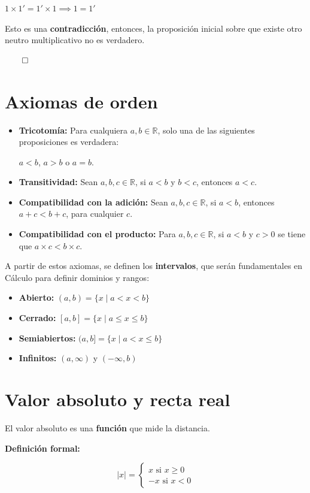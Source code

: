 \documentclass{article}
\begin{document}
$1 \times 1' = 1' \times 1 \implies 1 = 1'$

Esto es una \textbf{contradicción}, entonces, la proposición inicial sobre que existe otro neutro multiplicativo no es verdadero.

$\qed$

\section{Axiomas de orden}

\begin{itemize}
    \item \textbf{Tricotomía:} Para cualquiera $a, b \in \mathbb{R}$, solo una de las siguientes proposiciones es verdadera: 
    
    $a < b$, $a > b$ o $a = b$.
    \item \textbf{Transitividad:} Sean $a, b, c \in \mathbb{R}$, si $a < b$ y $b < c$, entonces $a < c$.
    \item \textbf{Compatibilidad con la adición:} Sean $a, b, c \in \mathbb{R}$, si $a < b$, entonces $a + c < b + c$, para cualquier $c$.
    \item \textbf{Compatibilidad con el producto:} Para $a, b, c \in \mathbb{R}$, si $a < b$ y $c > 0$ se tiene que $a \times c < b \times c$.
\end{itemize}

A partir de estos axiomas, se definen los \textbf{intervalos}, que serán fundamentales en Cálculo para definir dominios y rangos:

\begin{itemize}
    \item \textbf{Abierto:} $(a, b) = \{x \mid a < x < b\}$
    \item \textbf{Cerrado:} $[a, b] = \{x \mid a \le x \le b\}$
    \item \textbf{Semiabiertos:} $(a, b] = \{x \mid a < x \le b\}$
    \item \textbf{Infinitos:} $(a, \infty)$ y $(-\infty, b)$
\end{itemize}

\section{Valor absoluto y recta real}

El valor absoluto es una \textbf{función} que mide la distancia.

\textbf{Definición formal:}

\[ 
\mid x \mid =  
\begin{cases}
    x \text{ si } x \ge 0 \\
    -x \text{ si } x < 0    
\end{cases}
\]
\end{document}
